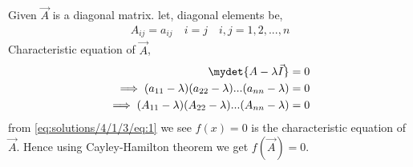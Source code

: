 Given  $\vec{A}$ is a diagonal matrix. let, diagonal elements be,
\begin{align}
{A}_{ij}= a_{ij} \quad i=j \quad i,j= 1,2,...,n
\end{align}
Characteristic equation of $\vec{A}$,
\begin{align}
\mydet{A-\lambda\vec{I}}=0\\
\implies (a_{11}-\lambda)(a_{22}-\lambda)...(a_{nn}-\lambda)=0\\
\implies(A_{11}-\lambda)(A_{22}-\lambda)...(A_{nn}-\lambda)=0\label{eq:solutions/4/1/3/eq:1}
\end{align}
from \eqref{eq:solutions/4/1/3/eq:1} we see $f(x)=0$ is the characteristic equation of $\vec{A}$. Hence using Cayley-Hamilton theorem we get $f(\vec{A})=0$.
